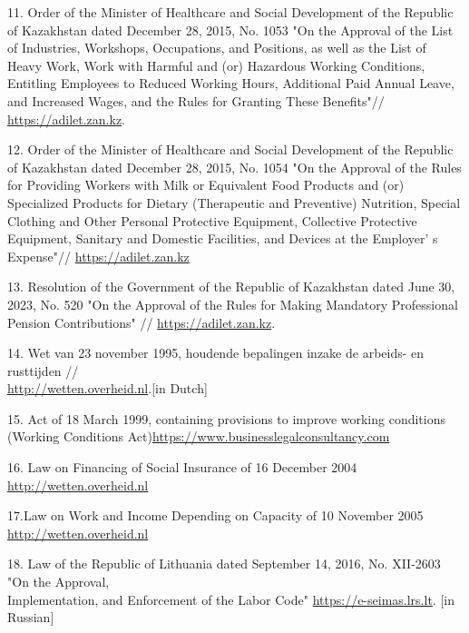 \begin{references}
11. Order of the Minister of Healthcare and Social Development of the
Republic of Kazakhstan dated December 28, 2015, No. 1053 "On the
Approval of the List of Industries, Workshops, Occupations, and
Positions, as well as the List of Heavy Work, Work with Harmful and (or)
Hazardous Working Conditions, Entitling Employees to Reduced Working
Hours, Additional Paid Annual Leave, and Increased Wages, and the Rules
for Granting These Benefits"//
\href{https://adilet.zan.kz/rus/docs/V1500012731}{https://adilet.zan.kz}.

12. Order of the Minister of Healthcare and Social Development of the
Republic of Kazakhstan dated December 28, 2015, No. 1054 "On the
Approval of the Rules for Providing Workers with Milk or Equivalent Food
Products and (or) Specialized Products for Dietary (Therapeutic and
Preventive) Nutrition, Special Clothing and Other Personal Protective
Equipment, Collective Protective Equipment, Sanitary and Domestic
Facilities, and Devices at the Employer' s Expense"//
\href{https://adilet.zan.kz/rus/docs/V1500012675}{https://adilet.zan.kz}

13. Resolution of the Government of the Republic of Kazakhstan dated
June 30, 2023, No. 520 "On the Approval of the Rules for Making
Mandatory Professional Pension Contributions" //
\href{https://adilet.zan.kz/rus/docs/P2300000520}{https://adilet.zan.kz}.

14. Wet van 23 november 1995, houdende bepalingen inzake de arbeids- en
rusttijden //\\\href{http://wetten.overheid.nl/jci1.3:c:BWBR0007671}{http://wetten.overheid.nl}.{[}in
Dutch{]}

15. Act of 18 March 1999, containing provisions to improve working
conditions (Working Conditions
Act)\href{https://www.businesslegalconsultancy.com/en/act-of-march-18-1999-containing-provisions-to-improve-working-conditions-act-on-working-conditions-1/}{https://www.businesslegalconsultancy.com}

16. Law on Financing of Social Insurance of 16 December 2004
\href{http://wetten.overheid.nl/jci1.3:c:BWBR0017745}{http://wetten.overheid.nl}

17.Law on Work and Income Depending on Capacity of 10 November 2005
\href{http://wetten.overheid.nl/jci1.3:c:BWBR0019057}{http://wetten.overheid.nl}

18. Law of the Republic of Lithuania dated September 14, 2016, No.
XII-2603 "On the Approval, \\Implementation, and Enforcement of the Labor
Code"
\href{https://e-seimas.lrs.lt/portal/legalAct/lt/TAD/bb10e743a97f11eb98ccba226c8a14d7?jfwid=kjtiqjlgg}{https://e-seimas.lrs.lt}.
{[}in Russian{]}


\end{references}
